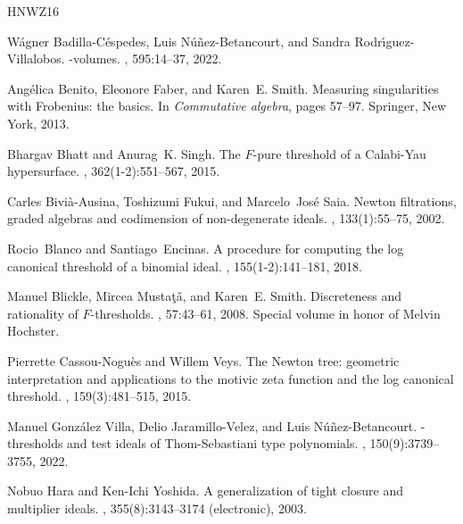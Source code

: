 \documentclass[12pt]{amsart}
\theoremstyle{definition}
\numberwithin{equation}{subsection}
\renewcommand{\!}[1]{{\color{red}\text{\Huge$\star$ }#1}}
\begin{document}

%
\begin{thebibliography}{HNWZ16}
	
	W\'{a}gner {Badilla-C\'{e}spedes}, Luis {N\'{u}{\~n}ez-Betancourt}, and Sandra
	{Rodr\'{\i}guez-Villalobos}.
	-volumes.
	, 595:14--37, 2022.
	
	Ang\'{e}lica Benito, Eleonore Faber, and Karen~E. Smith.
	\newblock Measuring singularities with {F}robenius: the basics.
	\newblock In {\em Commutative algebra}, pages 57--97. Springer, New York, 2013.
	
	Bhargav Bhatt and Anurag~K. Singh.
	\newblock The {$F$}-pure threshold of a {C}alabi-{Y}au hypersurface.
	, 362(1-2):551--567, 2015.
	
	Carles {Bivi\`a-Ausina}, Toshizumi Fukui, and Marcelo~Jos\'{e} Saia.
	\newblock Newton filtrations, graded algebras and codimension of non-degenerate
	ideals.
	, 133(1):55--75, 2002.
	
	Rocio~Blanco and Santiago~Encinas.
	\newblock A procedure for computing the log canonical threshold of a binomial
	ideal.
	, 155(1-2):141--181, 2018.
	
	Manuel Blickle, Mircea Musta{\c{t}}{\v{a}}, and Karen~E. Smith.
	\newblock Discreteness and rationality of {$F$}-thresholds.
	, 57:43--61, 2008.
	\newblock Special volume in honor of Melvin Hochster.
	
	Pierrette Cassou-Nogu\`es and Willem Veys.
	\newblock The {N}ewton tree: geometric interpretation and applications to the
	motivic zeta function and the log canonical threshold.
	, 159(3):481--515, 2015.
	
	Manuel {Gonz\'{a}lez Villa}, Delio {Jaramillo-Velez}, and Luis
	{N\'{u}{\~n}ez-Betancourt}.
	-thresholds and test ideals of {T}hom-{S}ebastiani type
	polynomials.
	, 150(9):3739--3755, 2022.
	
	Nobuo Hara and Ken-Ichi Yoshida.
	\newblock A generalization of tight closure and multiplier ideals.
	, 355(8):3143--3174 (electronic), 2003.
	

\end{thebibliography}
\end{document}
